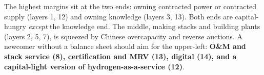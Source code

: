 \begin{finding}
The highest margins sit at the two ends: owning contracted power or contracted supply (layers 1, 12) and owning knowledge (layers 3, 13). Both ends are capital-hungry \emph{except} the knowledge end. The middle, making stacks and building plants (layers 2, 5, 7), is squeezed by Chinese overcapacity and reverse auctions. A newcomer without a balance sheet should aim for the upper-left: \textbf{O\&M and stack service (8), certification and MRV (13), digital (14), and a capital-light version of hydrogen-as-a-service (12)}. \confM
\end{finding}
